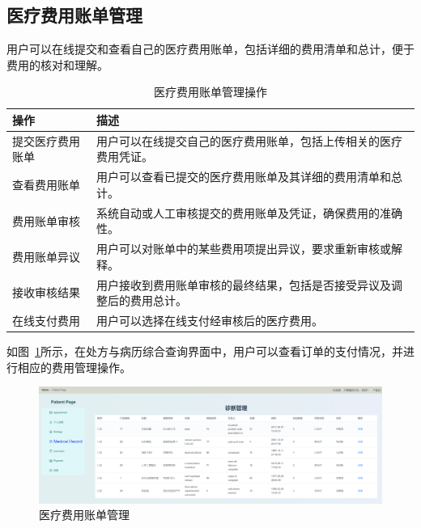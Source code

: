 \subsection{医疗费用账单管理}
用户可以在线提交和查看自己的医疗费用账单，包括详细的费用清单和总计，便于费用的核对和理解。
\begin{table}[htbp]
	\centering
	\begin{tabular}{|p{6cm}|p{6cm}|}
		\hline
		\textbf{操作} & \textbf{描述} \\
		\hline
		提交医疗费用账单 & 用户可以在线提交自己的医疗费用账单，包括上传相关的医疗费用凭证。 \\
		查看费用账单 & 用户可以查看已提交的医疗费用账单及其详细的费用清单和总计。 \\
		费用账单审核 & 系统自动或人工审核提交的费用账单及凭证，确保费用的准确性。 \\
		费用账单异议 & 用户可以对账单中的某些费用项提出异议，要求重新审核或解释。 \\
		接收审核结果 & 用户接收到费用账单审核的最终结果，包括是否接受异议及调整后的费用总计。 \\
		在线支付费用 & 用户可以选择在线支付经审核后的医疗费用。 \\
		\hline
	\end{tabular}
	\caption{医疗费用账单管理操作}
\end{table}
如图~\ref{a112}所示，在处方与病历综合查询界面中，用户可以查看订单的支付情况，并进行相应的费用管理操作。
\begin{figure}[!h]
	\centering
	\includegraphics[width=\textwidth]{figures/a11.png}
	\caption{医疗费用账单管理}
	\label{a112}
\end{figure}

